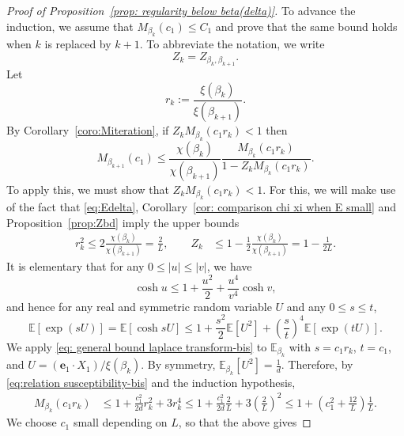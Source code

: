 \documentclass[10pt,a4paper]{amsart}
\begin{document}
\begin{proof}[Proof of Proposition~\textup{\ref{prop: regularity below beta(delta)}}]
To advance the induction, we assume that $M_{\beta_k}(c_1) \le C_1$
and prove that the same bound holds when $k$ is replaced by $k+1$.
To abbreviate the notation, we write
\begin{equation}
    Z_k = Z_{\beta_k,\beta_{k+1}}.
\end{equation}
Let
\begin{equation}
    r_k := \frac{\xi(\beta_k)}{\xi(\beta_{k+1})}.
\end{equation}
By Corollary~\ref{coro:Miteration}, if $Z_k M_{\beta_k}(c_1r_k) < 1$ then
\begin{equation}
\label{eq:Msum}
    M_{\beta_{k+1}}(c_1 )
    \le
    \frac{\chi(\beta_k)}{\chi(\beta_{k+1})}
    \frac{M_{\beta_k}(c_1r_k)}{1-Z_k M_{\beta_k}(c_1r_k)}
    .
\end{equation}
To apply this, we must show that $Z_{k} M_{\beta_k}(c_1r_k)<1$.
For this, we will make use of the fact that \eqref{eq:Edelta},
Corollary~\ref{cor: comparison chi xi when E small} and Proposition~\ref{prop:Zbd}
imply the upper bounds
 \begin{align}\label{eq:relation susceptibility-bis}
    r_k^2 \le 2\frac{\chi(\beta_k)}{\chi(\beta_{k+1})}= \frac{2}{L},
\qquad
   Z_{k} &\le  1-\frac{1}{2}\frac{\chi(\beta_k)}{\chi(\beta_{k+1})}=1-\frac{1}{2L}.
    \end{align}
It is elementary that for any $0 \le |u|\le |v|$, we have
\begin{equation}
    \cosh u \le 1 + \frac{u^2}{2} + \frac{u^4}{v^4}\cosh v,
\end{equation}
and hence for any real and symmetric random variable $U$ and
any $0 \le s\le t$,
\begin{equation}\label{eq: general bound laplace transform-bis}
\mathbb E[\exp(sU)] = \mathbb E[\cosh sU]
\le 1+\frac{s^2}{2}\mathbb E[U^2]+\left(\frac st\right)^4\mathbb E[\exp(tU)].
\end{equation}
We apply \eqref{eq: general bound laplace transform-bis}
to $\mathbb E_{\beta_k}$ with $s=c_1r_k$,
$t=c_1$, and $U= (\mathbf{e}_1\cdot X_1)/\xi(\beta_{k})$.
By symmetry, $\mathbb E_{\beta_k}[U^2] =\frac{1}{d}$.
Therefore,  by \eqref{eq:relation susceptibility-bis}
and the induction hypothesis,
\begin{align}
M_{\beta_k}(c_1r_k)
&\le
1+\frac{c_1^2}{2d} r_k^2
+3 r_k^4
\le
1+\frac{c_1^2}{2d}\frac{2}{L}+ 3\left(\frac{2}{L}\right)^{2}
\le 1+\left(c_1^2 + \frac{12}{L}\right)\frac{1}{L} .
\label{eq: proof regularity 2-bis}
\end{align}
We choose $c_1$ small depending on $L$, so that the above gives

\end{proof}
\end{document}
